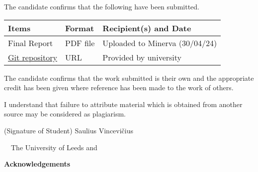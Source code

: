 \frontcover

\clearpage

\noindent The candidate confirms that the following have been submitted.\\


\begin{table}[ht!]
\begin{tabular}{|p{}|p{}|p{}|}
\hline 
Items & Format & Recipient(s) and Date \\ 
\hline 
Final Report & PDF file & Uploaded to Minerva (30/04/24) \\ 
\hline 
\href{https://github.com/uol-feps-soc-comp3931-2324-classroom/final-year-project-Biebras}{Git repository} & URL & Provided by university \\ 
\hline 
\end{tabular} 
\end{table}


\vfill

\noindent The candidate confirms that the work submitted is their own and the appropriate credit has been given where reference has been made to the work of others.

\vfill

\noindent I understand that failure to attribute material which is obtained from another source may be considered as plagiarism.

\vfill

\flushright(Signature of Student) Saulius Vincevičius
\flushleft

\vfill

\textcopyright~\session~The University of Leeds and~\fullname

\begin{dissertationsummary}

\end{dissertationsummary}

\clearpage
\centering\textbf{Acknowledgements}
\flushleft


\tableofcontents

\clearpage

